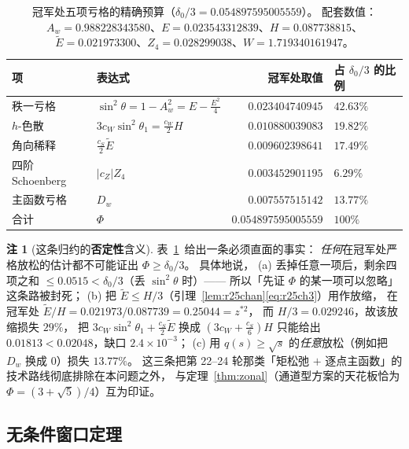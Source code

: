 \documentclass[UTF8,11pt]{ctexart}
\theoremstyle{definition}
\newtheorem{remark}[theorem]{注}
\begin{document}
\begin{table}[ht]\centering\small
\begin{tabular}{llrl}
\toprule
项 & 表达式 & 冠军处取值 & 占 $\delta_0/3$ 的比例\\
\midrule
秩一亏格 & $\sin^2\theta=1-A_w^2=E-\frac{E^2}4$ & $0.023404740945$ & $42.63\%$\\
$h$-色散 & $3c_W\sin^2\theta_1=\frac{c_W}2H$ & $0.010880039083$ & $19.82\%$\\
角向稀释 & $\frac{c_S}2\widetilde E$ & $0.009602398641$ & $17.49\%$\\
四阶 Schoenberg & $|c_Z|Z_4$ & $0.003452901195$ & $6.29\%$\\
主函数亏格 & $D_w$ & $0.007557515142$ & $13.77\%$\\
\midrule
合计 & $\Phi$ & $0.054897595005559$ & $100\%$\\
\bottomrule
\end{tabular}
\caption{冠军处五项亏格的精确预算（$\delta_0/3=0.054897595005559$）。
配套数值：$A_w=0.988228343580$、$E=0.023543312839$、$H=0.087738815$、
$\widetilde E=0.021973300$、$Z_4=0.028299038$、$W=1.719340161947$。}\label{tab:r25budget}
\end{table}

\begin{remark}[这条归约的\textbf{否定性}含义]\label{rem:r25no}
表~\ref{tab:r25budget}~给出一条必须直面的事实：
\emph{任何}在冠军处严格放松的估计都不可能证出 $\Phi\ge\delta_0/3$。
具体地说，
(a) 丢掉任意一项后，剩余四项之和 $\le0.0515<\delta_0/3$（丢 $\sin^2\theta$ 时）——
所以「先证 $\Phi$ 的某一项可以忽略」这条路被封死；
(b) 把 $\widetilde E\le H/3$（引理~\ref{lem:r25chan}\eqref{eq:r25ch3}）用作放缩，
在冠军处 $\widetilde E/H=0.021973/0.087739=0.25044=z^{*2}$，
而 $H/3=0.029246$，故该放缩损失 $29\%$，
把 $3c_W\sin^2\theta_1+\frac{c_S}2\widetilde E$ 换成 $(3c_W+\frac{c_S}6)H$
只能给出 $0.01813<0.02048$，缺口 $2.4\times10^{-3}$；
(c) 用 $q(s)\ge\sqrt s$ 的\emph{任意}放松（例如把 $D_w$ 换成 $0$）损失 $13.77\%$。
这三条把第 22--24 轮那类「矩松弛 $+$ 逐点主函数」的技术路线彻底排除在本问题之外，
与定理~\ref{thm:zonal}（通道型方案的天花板恰为 $\Phi=(3+\sqrt5)/4$）互为印证。
\end{remark}

\subsection{无条件窗口定理}\label{sec:r25:window}
\end{document}
